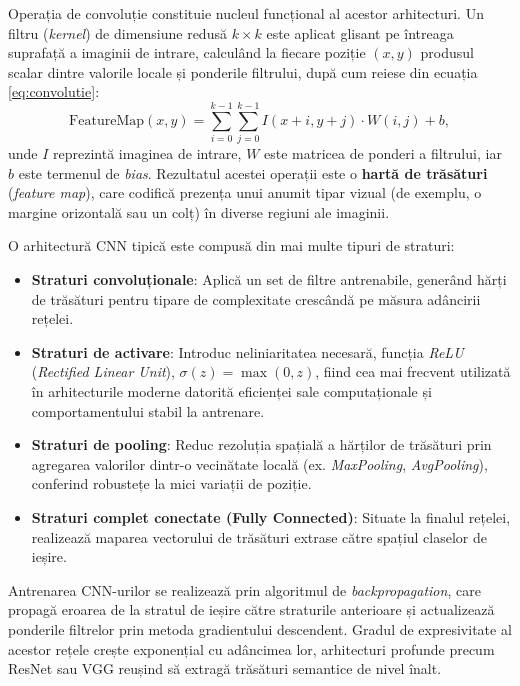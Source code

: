 Operația de convoluție constituie nucleul funcțional al acestor arhitecturi. Un filtru (\textit{kernel}) de dimensiune redusă $k \times k$ este aplicat glisant pe întreaga suprafață a imaginii de intrare, calculând la fiecare poziție $(x,y)$ produsul scalar dintre valorile locale și ponderile filtrului, după cum reiese din ecuația \eqref{eq:convolutie}:
\begin{equation}
	\label{eq:convolutie}
	\text{FeatureMap}(x, y) = \sum_{i=0}^{k-1} \sum_{j=0}^{k-1} I(x+i, y+j) \cdot W(i, j) + b,
\end{equation}
unde $I$ reprezintă imaginea de intrare, $W$ este matricea de ponderi a filtrului, iar $b$ este termenul de \textit{bias}. Rezultatul acestei operații este o \textbf{hartă de trăsături} (\textit{feature map}), care codifică prezența unui anumit tipar vizual (de exemplu, o margine orizontală sau un colț) în diverse regiuni ale imaginii.

O arhitectură CNN tipică este compusă din mai multe tipuri de straturi:
\begin{itemize}[noitemsep]
	\item \textbf{Straturi convoluționale}: Aplică un set de filtre antrenabile, generând hărți de trăsături pentru tipare de complexitate crescândă pe măsura adâncirii rețelei.
	\item \textbf{Straturi de activare}: Introduc neliniaritatea necesară, funcția \textit{ReLU} (\textit{Rectified Linear Unit}), $\sigma(z) = \max(0, z)$, fiind cea mai frecvent utilizată în arhitecturile moderne datorită eficienței sale computaționale și comportamentului stabil la antrenare.
	\item \textbf{Straturi de pooling}: Reduc rezoluția spațială a hărților de trăsături prin agregarea valorilor dintr-o vecinătate locală (ex. \textit{MaxPooling}, \textit{AvgPooling}), conferind robustețe la mici variații de poziție.
	\item \textbf{Straturi complet conectate (Fully Connected)}: Situate la finalul rețelei, realizează maparea vectorului de trăsături extrase către spațiul claselor de ieșire.
\end{itemize}

Antrenarea CNN-urilor se realizează prin algoritmul de \textit{backpropagation}, care propagă eroarea de la stratul de ieșire către straturile anterioare și actualizează ponderile filtrelor prin metoda gradientului descendent. Gradul de expresivitate al acestor rețele crește exponențial cu adâncimea lor, arhitecturi profunde precum ResNet \cite{he2016} sau VGG \cite{simonyan2015very} reușind să extragă trăsături semantice de nivel înalt.


